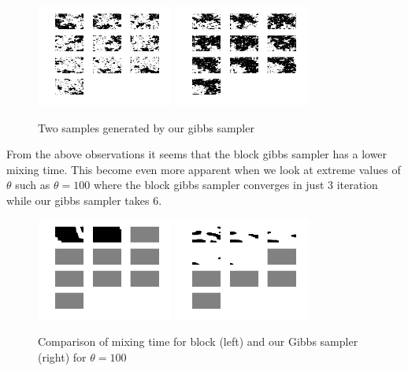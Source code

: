 \documentclass[10pt,onecolumn,letterpaper]{article}
\begin{document}
\begin{figure}[htbp]
  \centering
    \includegraphics[width=0.4\textwidth]{Images/gibbs_sampler_1.png}
    \hfill
	\includegraphics[width=0.4\textwidth]{Images/gibbs_sampler_2.png}
    \caption{Two samples generated by our gibbs sampler} 
\end{figure}


From the above observations it seems that the block gibbs sampler has a lower mixing time. This become even more apparent when we look at extreme values of $\theta$ such as $\theta=100$ where the block gibbs sampler converges in just 3 iteration while our gibbs sampler takes 6.

\begin{figure}[htbp]
  \centering
    \includegraphics[width=0.4\textwidth]{Images/block_theta_100.png}
    \hfill
\includegraphics[width=0.4\textwidth]{Images/gibbs_sampler_theta_100.png}
    \caption{Comparison of mixing time for block (left) and our Gibbs sampler (right) for $\theta=100$}
\end{figure}
\end{document}
